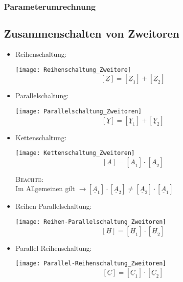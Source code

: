 \subsubsection{Parameterumrechnung}


\subsection{Zusammenschalten von Zweitoren}

\begin{mdframed}[style=exercise]
\begin{itemize}
    \item Reihenschaltung:
        \begin{center}
            \texttt{[image: Reihenschaltung\_Zweitore]}
        \[
            \left[ \underline{Z} \right] = \left[ \underline{Z}_1 \right] + \left[ \underline{Z}_2 \right]
        \]
        \end{center}
    \item Parallelschaltung:
        \begin{center}
            \texttt{[image: Parallelschaltung\_Zweitoren]}
        \[
            \left[ \underline{Y} \right] = \left[ \underline{Y}_1 \right] + \left[ \underline{Y}_2 \right]
        \]
        \end{center}
    \item Kettenschaltung:
        \begin{center}
            \texttt{[image: Kettenschaltung\_Zweitoren]}
        \[
            \left[ \underline{A} \right] = \left[ \underline{A}_1 \right] \cdot \left[ \underline{A}_2 \right]
        \]
        \end{center}
        \footnotesize
        \textsc{Beachte:}\\
        \normalsize Im Allgemeinen gilt $\rightarrow
        \left[ \underline{A}_1 \right] \cdot \left[
        \underline{A}_2 \right] \neq \left[ \underline{A}_2
        \right] \cdot \left[ \underline{A}_1 \right]$
    \item Reihen-Parallelschaltung:
        \begin{center}
            \texttt{[image: Reihen-Parallelschaltung\_Zweitoren]}
        \[
            \left[ \underline{H} \right] = \left[ \underline{H}_1 \right] \cdot \left[ \underline{H}_2 \right]
        \]
        \end{center}
    \item Parallel-Reihenschaltung:
        \begin{center}
            \texttt{[image: Parallel-Reihenschaltung\_Zweitoren]}
        \[
            \left[ \underline{C} \right] = \left[ \underline{C}_1 \right] \cdot \left[ \underline{C}_2 \right]
        \]
        \end{center}
\end{itemize}
\end{mdframed}


